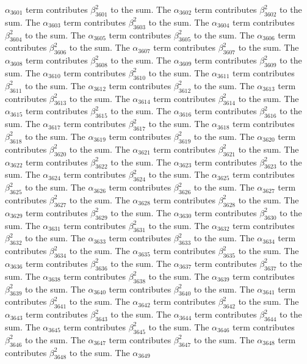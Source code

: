 \begin{lemma}
$\alpha_{3601}$ term contributes $\beta_{3601}^{2}$ to the sum. The $\alpha_{3602}$ term contributes $\beta_{3602}^{2}$ to the sum. The $\alpha_{3603}$ term contributes $\beta_{3603}^{2}$ to the sum. The $\alpha_{3604}$ term contributes $\beta_{3604}^{2}$ to the sum. The $\alpha_{3605}$ term contributes $\beta_{3605}^{2}$ to the sum. The $\alpha_{3606}$ term contributes $\beta_{3606}^{2}$ to the sum. The $\alpha_{3607}$ term contributes $\beta_{3607}^{2}$ to the sum. The $\alpha_{3608}$ term contributes $\beta_{3608}^{2}$ to the sum. The $\alpha_{3609}$ term contributes $\beta_{3609}^{2}$ to the sum. The $\alpha_{3610}$ term contributes $\beta_{3610}^{2}$ to the sum. The $\alpha_{3611}$ term contributes $\beta_{3611}^{2}$ to the sum. The $\alpha_{3612}$ term contributes $\beta_{3612}^{2}$ to the sum. The $\alpha_{3613}$ term contributes $\beta_{3613}^{2}$ to the sum. The $\alpha_{3614}$ term contributes $\beta_{3614}^{2}$ to the sum. The $\alpha_{3615}$ term contributes $\beta_{3615}^{2}$ to the sum. The $\alpha_{3616}$ term contributes $\beta_{3616}^{2}$ to the sum. The $\alpha_{3617}$ term contributes $\beta_{3617}^{2}$ to the sum. The $\alpha_{3618}$ term contributes $\beta_{3618}^{2}$ to the sum. The $\alpha_{3619}$ term contributes $\beta_{3619}^{2}$ to the sum. The $\alpha_{3620}$ term contributes $\beta_{3620}^{2}$ to the sum. The $\alpha_{3621}$ term contributes $\beta_{3621}^{2}$ to the sum. The $\alpha_{3622}$ term contributes $\beta_{3622}^{2}$ to the sum. The $\alpha_{3623}$ term contributes $\beta_{3623}^{2}$ to the sum. The $\alpha_{3624}$ term contributes $\beta_{3624}^{2}$ to the sum. The $\alpha_{3625}$ term contributes $\beta_{3625}^{2}$ to the sum. The $\alpha_{3626}$ term contributes $\beta_{3626}^{2}$ to the sum. The $\alpha_{3627}$ term contributes $\beta_{3627}^{2}$ to the sum. The $\alpha_{3628}$ term contributes $\beta_{3628}^{2}$ to the sum. The $\alpha_{3629}$ term contributes $\beta_{3629}^{2}$ to the sum. The $\alpha_{3630}$ term contributes $\beta_{3630}^{2}$ to the sum. The $\alpha_{3631}$ term contributes $\beta_{3631}^{2}$ to the sum. The $\alpha_{3632}$ term contributes $\beta_{3632}^{2}$ to the sum. The $\alpha_{3633}$ term contributes $\beta_{3633}^{2}$ to the sum. The $\alpha_{3634}$ term contributes $\beta_{3634}^{2}$ to the sum. The $\alpha_{3635}$ term contributes $\beta_{3635}^{2}$ to the sum. The $\alpha_{3636}$ term contributes $\beta_{3636}^{2}$ to the sum. The $\alpha_{3637}$ term contributes $\beta_{3637}^{2}$ to the sum. The $\alpha_{3638}$ term contributes $\beta_{3638}^{2}$ to the sum. The $\alpha_{3639}$ term contributes $\beta_{3639}^{2}$ to the sum. The $\alpha_{3640}$ term contributes $\beta_{3640}^{2}$ to the sum. The $\alpha_{3641}$ term contributes $\beta_{3641}^{2}$ to the sum. The $\alpha_{3642}$ term contributes $\beta_{3642}^{2}$ to the sum. The $\alpha_{3643}$ term contributes $\beta_{3643}^{2}$ to the sum. The $\alpha_{3644}$ term contributes $\beta_{3644}^{2}$ to the sum. The $\alpha_{3645}$ term contributes $\beta_{3645}^{2}$ to the sum. The $\alpha_{3646}$ term contributes $\beta_{3646}^{2}$ to the sum. The $\alpha_{3647}$ term contributes $\beta_{3647}^{2}$ to the sum. The $\alpha_{3648}$ term contributes $\beta_{3648}^{2}$ to the sum. The $\alpha_{3649}$ 
\end{lemma}
